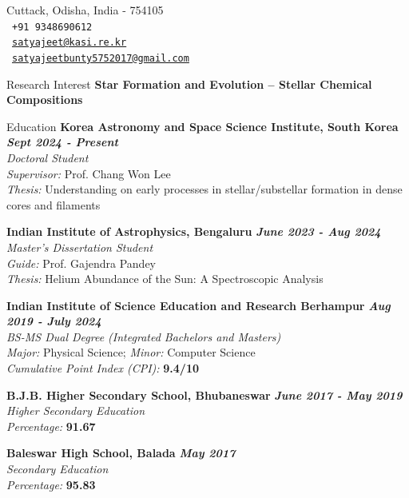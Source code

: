\documentclass{resume} %
\begin{document}
\begin{center}
    \vspace{-1cm}
    \large{Cuttack, Odisha, India - 754105} \\ %
    {\faPhone} \ \texttt{+91 9348690612} \\ %
    {\faEnvelope} \ \texttt{\href{mailto:satyajeet@kasi.re.kr}{satyajeet@kasi.re.kr}} \\
    {\faEnvelope} \ \texttt{\href{mailto:satyajeetbunty5752017@gmail.com}{satyajeetbunty5752017@gmail.com}} %
\end{center}


\begin{rSection}{Research Interest}
\centering
{\bf Star Formation and Evolution – Stellar Chemical Compositions}
\end{rSection}

\begin{rSection}{Education}
{\bf Korea Astronomy and Space Science Institute, South Korea} \hfill {\em \bf Sept 2024 - Present}\\
\textit{Doctoral Student}\\
\textit{Supervisor:} Prof. Chang Won Lee \\
\textit{Thesis:} Understanding on early processes in stellar/substellar
formation in dense cores and filaments

{\bf Indian Institute of Astrophysics, Bengaluru} \hfill {\em \bf June 2023 - Aug 2024}\\
\textit{Master's Dissertation Student}\\
\textit{Guide:} Prof. Gajendra Pandey\\
\textit{Thesis:} Helium Abundance of the Sun: A Spectroscopic Analysis

{\bf Indian Institute of Science Education and Research Berhampur} \hfill {\em \bf Aug 2019 - July 2024} \\
\textit{BS-MS Dual Degree (Integrated Bachelors and Masters)}
\\ \textit{Major:} Physical Science; \textit{Minor:} Computer Science\\
\textit{Cumulative Point Index (CPI):} \textbf{9.4/10}

{\bf B.J.B. Higher Secondary School, Bhubaneswar} \hfill {\em \bf June 2017 - May 2019} \\
\textit{Higher Secondary Education} 
\\ \textit{Percentage:} \textbf{91.67}

{\bf Baleswar High School, Balada} \hfill{\em \bf May 2017}\\
\textit{Secondary Education}
\\ \textit{Percentage:} \textbf{95.83}
\end{rSection}
\end{document}
